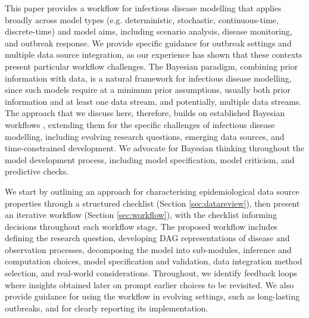 \documentclass{article}
\begin{document}
This paper provides a workflow for infectious disease modelling that applies broadly across model types (e.g. deterministic, stochastic, continuous-time, discrete-time) and model aims, including scenario analysis, disease monitoring, and outbreak response. We provide specific guidance for outbreak settings and multiple data source integration, as our experience has shown that these contexts present particular workflow challenges.
The Bayesian paradigm, combining prior information with data, is a natural framework for infectious disease modelling, since such models require at a minimum prior assumptions, usually both prior information and at least one data stream, and potentially, multiple data streams. The approach that we discuss here, therefore, builds on established Bayesian workflows \citep{green2003highly,gelman2020bayesian},
extending them for the specific challenges of infectious disease modelling, including evolving research questions, emerging data sources, and time-constrained development.
We advocate for Bayesian thinking throughout the model development process, including model specification, model criticism, and predictive checks.


We start by outlining an approach for characterising epidemiological data source properties through a structured checklist (Section \ref{sec:datareview}), then present an iterative workflow (Section \ref{sec:workflow}), with the checklist informing decisions throughout each workflow stage.
The proposed workflow includes defining the research question, developing \ac{DAG} representations of disease and observation processes, decomposing the model into sub-modules, inference and computation choices, model specification and validation, data integration method selection, and real-world considerations.
Throughout, we identify feedback loops where insights obtained later on prompt earlier choices to be revisited.
We also provide guidance for using the workflow in evolving settings, such as long-lasting outbreaks, and for clearly reporting its implementation.
\end{document}
